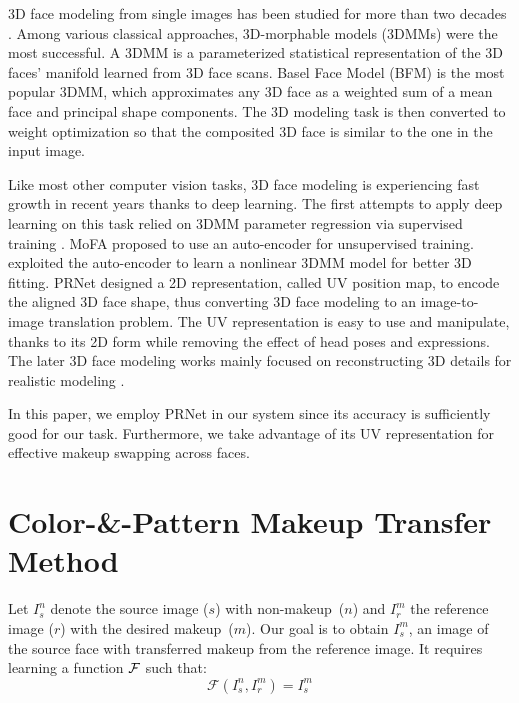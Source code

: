 \documentclass[final]{cvpr}
\begin{document}
3D face modeling from single images has been studied for more than two decades \cite{vetter1998estimating}. Among various classical approaches, 3D-morphable models (3DMMs) \cite{blanz1999morphable,paysan09basel,romdhani2003efficient} were the most successful. A 3DMM is a parameterized statistical representation of the 3D faces' manifold learned from 3D face scans. Basel Face Model (BFM) \cite{paysan09basel} is the most popular 3DMM, which approximates any 3D face as a weighted sum of a mean face and principal shape components. The 3D modeling task is then converted to weight optimization so that the composited 3D face is similar to the one in the input image.



Like most other computer vision tasks, 3D face modeling is experiencing fast growth in recent years thanks to deep learning. The first attempts to apply deep learning on this task relied on 3DMM parameter regression via supervised training \cite{Zhu2016Face,tran16_3dmm_cnn,richardson20163d}. MoFA \cite{Tewari_2017_ICCV} proposed to use an auto-encoder for unsupervised training. \citet{tran2018nonlinear} exploited the auto-encoder to learn a nonlinear 3DMM model for better 3D fitting. PRNet \cite{feng2018prn} designed a 2D representation, called UV position map, to encode the aligned 3D face shape, thus converting 3D face modeling to an image-to-image translation problem. The UV representation is easy to use and manipulate, thanks to its 2D form while removing the effect of head poses and expressions. The later 3D face modeling works mainly focused on reconstructing 3D details for realistic modeling \cite{tran2018extreme,Chen_2019_ICCV,yang2020facescape}.

In this paper, we employ PRNet \cite{feng2018prn} in our system since its accuracy is sufficiently good for our task. Furthermore, we take advantage of its UV representation for effective makeup swapping across faces.

\section{Color-\&-Pattern Makeup Transfer Method}
\vspace{-1mm}












Let $I_s^n$ denote the source image ($s$) with non-makeup~($n$) and $I_r^m$ the reference image ($r$) with the desired makeup~($m$). 
Our goal is to obtain $I_s^m$, an image of the source face with transferred makeup from the reference image. It requires learning a function $\mathcal{F}$ such that: 
\begin{equation}
    \mathcal{F}(I_{s}^{n}, I_{r}^{m})= I_{s}^{m}
\end{equation}
\end{document}
